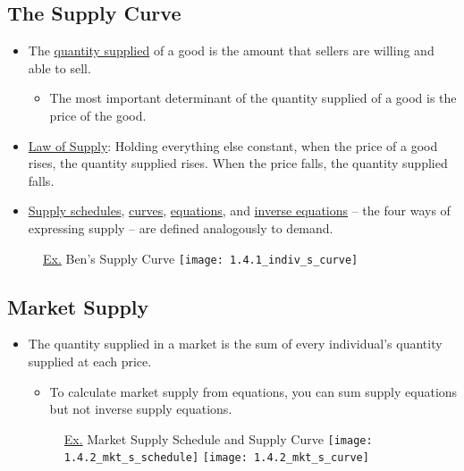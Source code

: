 \subsection{The Supply Curve}

	\begin{itemize}
	
	\item The \underline{quantity supplied} of a good is the amount that sellers are willing and able to sell.
	
		\begin{itemize}
		
		\item The most important determinant of the quantity supplied of a good is the price of the good.
		
		\end{itemize}
		
	\item \underline{Law of Supply}: Holding everything else constant, when the price of a good rises, the quantity supplied rises. When the price falls, the quantity supplied falls.
	
	\item \underline{Supply schedules}, \underline{curves}, \underline{equations}, and \underline{inverse equations} -- the four ways of expressing supply -- are defined analogously to demand.
	
	
	\end{itemize}
	
	\begin{figure}[p]
	\underline{Ex.} Ben's Supply Curve
	\centering
	\texttt{[image: 1.4.1\_indiv\_s\_curve]}
	\end{figure}
	
\subsection{Market Supply}

	\begin{itemize}
	
	\item The quantity supplied in a market is the sum of every individual's quantity supplied at each price.
	
		\begin{itemize}
		
		\item To calculate market supply from equations, you can sum supply equations but not inverse supply equations.
		
		\end{itemize}
	
	\begin{figure}[p]
	\underline{Ex.} Market Supply Schedule and Supply Curve
	\centering
	\texttt{[image: 1.4.2\_mkt\_s\_schedule]}
	\texttt{[image: 1.4.2\_mkt\_s\_curve]}
	\end{figure}
	
	\end{itemize}
	
